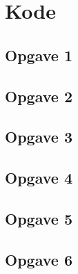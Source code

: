 \chapter{Kode}
\section{Opgave 1}

\clearpage
\section{Opgave 2}

\clearpage
\section{Opgave 3}

\clearpage
\section{Opgave 4}

\section{Opgave 5}
\clearpage
\section{Opgave 6}
\clearpage